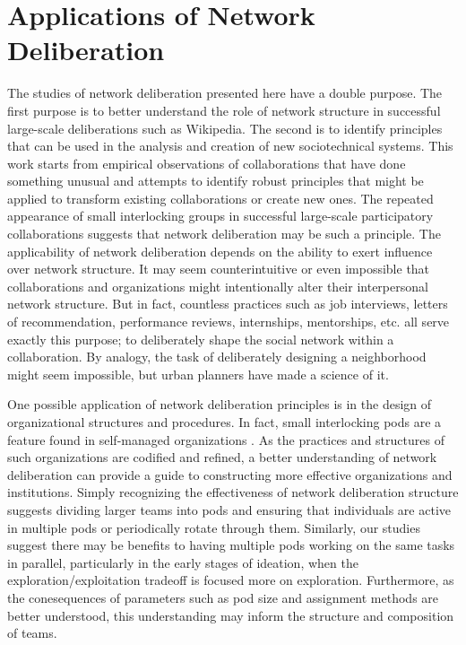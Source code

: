 \section{Applications of Network Deliberation}
The studies of network deliberation presented here have a double purpose.
The first purpose is to better understand the role of network structure in successful large-scale deliberations such as Wikipedia.
The second is to identify principles that can be used in the analysis and creation of new sociotechnical systems.
This work starts from empirical observations of collaborations that have done something unusual and attempts to identify robust principles that might be applied to transform existing collaborations or create new ones.
The repeated appearance of small interlocking groups in successful large-scale participatory collaborations suggests that network deliberation may be such a principle.
The applicability of network deliberation depends on the ability to exert influence over network structure.
It may seem counterintuitive or even impossible that collaborations and organizations might intentionally alter their interpersonal network structure.
But in fact, countless practices such as job interviews, letters of recommendation,
performance reviews, internships, mentorships, etc. all serve exactly this purpose;
to deliberately shape the social network within a collaboration.
By analogy, the task of deliberately designing a neighborhood might seem impossible,
but urban planners have made a science of it.

One possible application of network deliberation principles is in the design of
organizational structures and procedures.
In fact, small interlocking pods are a feature found in self-managed organizations
\cite{laloux_reinventing_2014}.
As the practices and structures of such organizations are codified and refined,
a better understanding of network deliberation can provide a guide to constructing
more effective organizations and institutions.
Simply recognizing the effectiveness of network deliberation structure suggests dividing
larger teams into pods and ensuring that individuals are active in multiple pods or
periodically rotate through them.
Similarly, our studies suggest there may be benefits to having multiple pods working on the
same tasks in parallel, particularly in the early stages of ideation,
when the exploration/exploitation tradeoff is focused more on exploration.
Furthermore, as the conesequences of parameters such as pod size and assignment methods are
better understood, this understanding may inform the structure and composition of teams.

